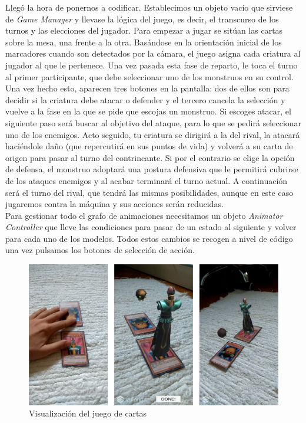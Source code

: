 Llegó la hora de ponernos a codificar. Establecimos un objeto vacío que sirviese de \textit{Game Manager} y llevase la lógica del juego, es decir, el transcurso de los turnos y las elecciones del jugador. Para empezar a jugar se sitúan las cartas sobre la mesa, una frente a la otra. Basándose en la orientación inicial de los marcadores cuando son detectados por la cámara, el juego asigna cada criatura al jugador al que le pertenece. Una vez pasada esta fase de reparto, le toca el turno al primer participante, que debe seleccionar uno de los monstruos en su control. Una vez hecho esto, aparecen tres botones en la pantalla: dos de ellos son para decidir si la criatura debe atacar o defender y el tercero cancela la selección y vuelve a la fase en la que se pide que escojas un monstruo. Si escoges atacar, el siguiente paso será buscar al objetivo del ataque, para lo que se pedirá seleccionar uno de los enemigos. Acto seguido, tu criatura se dirigirá a la del rival, la atacará haciéndole daño (que repercutirá en sus puntos de vida) y volverá a su carta de origen para pasar al turno del contrincante. Si por el contrario se elige la opción de defensa, el monstruo adoptará una postura defensiva que le permitirá cubrirse de los ataques enemigos y al acabar terminará el turno actual. A continuación será el turno del rival, que tendrá las mismas posibilidades, aunque en este caso jugaremos contra la máquina y sus acciones serán reducidas.\\

Para gestionar todo el grafo de animaciones necesitamos un objeto \textit{Animator Controller} que lleve las condiciones para pasar de un estado al siguiente y volver para cada uno de los modelos. Todos estos cambios se recogen a nivel de código una vez pulsamos los botones de selección de acción.\\

\begin{figure}[H]
    \centering
    \includegraphics[width=\linewidth]{Images/YuGiOh.jpg}
    \caption{Visualización del juego de cartas}
    \label{YuGi}
\end{figure}

